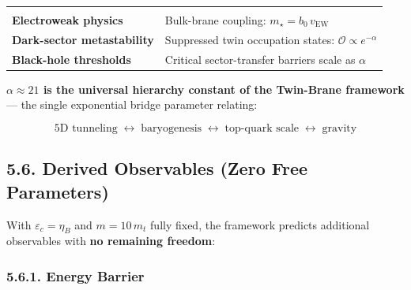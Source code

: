 \documentclass[
  11pt,
]{article}
\begin{document}
\begin{longtable}[]{@{}ll@{}}
\begin{minipage}[t]{0.64\columnwidth}
\end{minipage}\tabularnewline
\begin{minipage}[t]{0.30\columnwidth}\raggedright
\textbf{Electroweak physics}\strut
\end{minipage} & \begin{minipage}[t]{0.64\columnwidth}\raggedright
Bulk-brane coupling: \(m_\star = b_0\,v_{\text{EW}}\)\strut
\end{minipage}\tabularnewline
\begin{minipage}[t]{0.30\columnwidth}\raggedright
\textbf{Dark-sector metastability}\strut
\end{minipage} & \begin{minipage}[t]{0.64\columnwidth}\raggedright
Suppressed twin occupation states:
\(\mathcal{O} \propto e^{-\alpha}\)\strut
\end{minipage}\tabularnewline
\begin{minipage}[t]{0.30\columnwidth}\raggedright
\textbf{Black-hole thresholds}\strut
\end{minipage} & \begin{minipage}[t]{0.64\columnwidth}\raggedright
Critical sector-transfer barriers scale as \(\alpha\)\strut
\end{minipage}\tabularnewline
\bottomrule
\end{longtable}

\textbf{\(\alpha \approx 21\) is the universal hierarchy constant of the
Twin-Brane framework} --- the single exponential bridge parameter
relating:

\[\text{5D tunneling} \;\longleftrightarrow\; \text{baryogenesis} \;\longleftrightarrow\; \text{top-quark scale} \;\longleftrightarrow\; \text{gravity} \tag{242}\]

\bigskip

\hypertarget{derived-observables-zero-free-parameters}{%
\subsection{5.6. Derived Observables (Zero Free
Parameters)}\label{derived-observables-zero-free-parameters}}

With \(\varepsilon_c = \eta_B\) and \(m = 10\,m_t\) fully fixed, the
framework predicts additional observables with \textbf{no remaining
freedom}:

\hypertarget{energy-barrier}{%
\subsubsection{5.6.1. Energy Barrier}\label{energy-barrier}}
\end{document}
